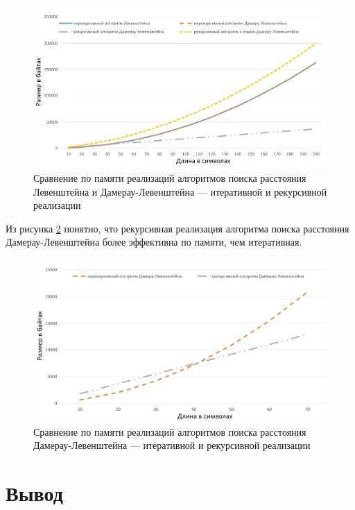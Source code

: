 \begin{figure}[!htbp]
	\centering
	\includegraphics[width=\textwidth]{img/diag_03.png}
	\caption{Сравнение по памяти реализаций алгоритмов поиска расстояния Левенштейна и Дамерау-Левенштейна --- итеративной и рекурсивной реализации}
	\label{plt:memory}
\end{figure}

Из рисунка \ref{plt:memory_1} понятно, что рекурсивная реализация алгоритма поиска расстояния Дамерау-Левенштейна более эффективна по памяти, чем итеративная.

\begin{figure}[!htbp]
	\centering
	\includegraphics[width=\textwidth]{img/diag_04.png}
	\caption{Сравнение по памяти реализаций алгоритмов поиска расстояния Дамерау-Левенштейна --- итеративной и рекурсивной реализации}
	\label{plt:memory_1}
\end{figure}

\clearpage

\section{Вывод}

